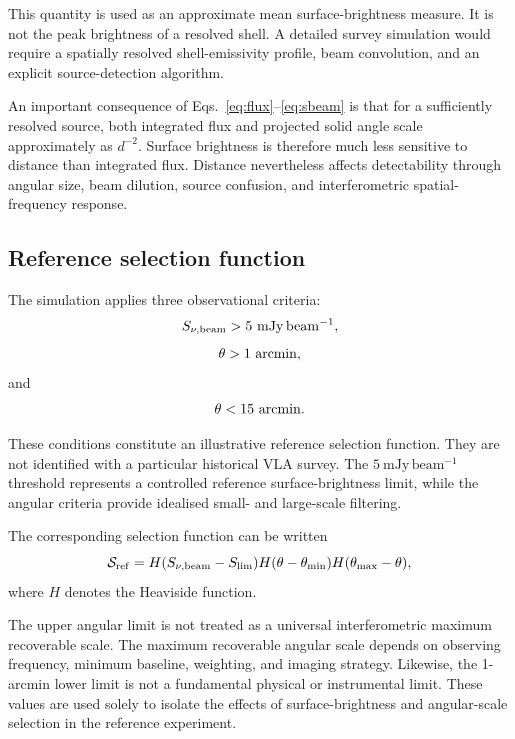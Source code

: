 \documentclass[
aps,
prd,
reprint,
superscriptaddress,
nofootinbib
]{revtex4-2}
\begin{document}
	This quantity is used as an approximate mean surface-brightness measure.  It
	is not the peak brightness of a resolved shell.  A detailed survey simulation
	would require a spatially resolved shell-emissivity profile, beam convolution,
	and an explicit source-detection algorithm.
	
	An important consequence of Eqs.~\eqref{eq:flux}--\eqref{eq:sbeam} is that
	for a sufficiently resolved source, both integrated flux and projected solid
	angle scale approximately as $d^{-2}$.  Surface brightness is therefore much
	less sensitive to distance than integrated flux.  Distance nevertheless
	affects detectability through angular size, beam dilution, source confusion,
	and interferometric spatial-frequency response.
	
	\subsection{Reference selection function}
	
	The simulation applies three observational criteria:
	\begin{equation}
		S_{\nu,\rm beam}>5~\mathrm{mJy\,beam^{-1}},
		\label{eq:slim}
	\end{equation}
	\begin{equation}
		\theta>1~{\rm arcmin},
		\label{eq:thetamin}
	\end{equation}
	and
	\begin{equation}
		\theta<15~{\rm arcmin}.
		\label{eq:thetamax}
	\end{equation}
	
	These conditions constitute an illustrative reference selection function.
	They are not identified with a particular historical VLA survey.  The
	$5~\mathrm{mJy\,beam^{-1}}$ threshold represents a controlled reference
	surface-brightness limit, while the angular criteria provide idealised
	small- and large-scale filtering.
	
	The corresponding selection function can be written
	\begin{equation}
		{\cal S}_{\rm ref}
		=
		H(S_{\nu,\rm beam}-S_{\rm lim})
		H(\theta-\theta_{\rm min})
		H(\theta_{\rm max}-\theta),
		\label{eq:selection}
	\end{equation}
	where $H$ denotes the Heaviside function.
	
	The upper angular limit is not treated as a universal interferometric maximum
	recoverable scale.  The maximum recoverable angular scale depends on observing
	frequency, minimum baseline, weighting, and imaging strategy.  Likewise, the
	1-arcmin lower limit is not a fundamental physical or instrumental limit.
	These values are used solely to isolate the effects of surface-brightness and
	angular-scale selection in the reference experiment.
	
\end{document}
